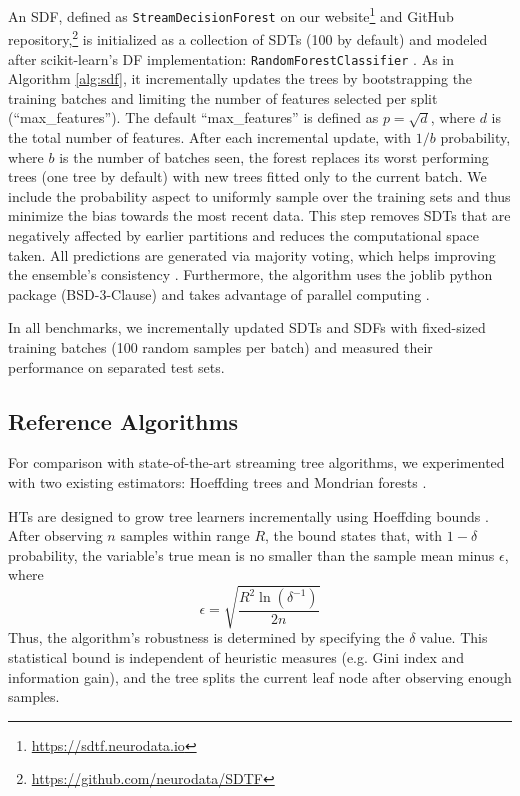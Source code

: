 An SDF, defined as \texttt{StreamDecisionForest} on our website\footnote{\url{https://sdtf.neurodata.io}} and GitHub repository,\footnote{\url{https://github.com/neurodata/SDTF}}
is initialized as a collection of SDTs (100 by default) and modeled after scikit-learn's DF implementation: \texttt{RandomForestClassifier} \citep{pedregosa_scikit-learn_2011}. As in Algorithm \ref{alg:sdf}, it incrementally updates the trees by bootstrapping the training batches and limiting the number of features selected per split (``max\_features''). The default ``max\_features'' is defined as $p=\sqrt{d}$, where $d$ is the total number of features. After each incremental update, with $1/b$ probability, where $b$ is the number of batches seen, the forest replaces its worst performing trees (one tree by default) with new trees fitted only to the current batch. We include the probability aspect to uniformly sample over the training sets and thus minimize the bias towards the most recent data. This step removes SDTs that are negatively affected by earlier partitions and reduces the computational space taken. All predictions are generated via majority voting, which helps improving the ensemble's consistency \citep{liaw_classification_2002, biau_consistency_2008, breiman_random_2001}. Furthermore, the algorithm uses the joblib python package (BSD-3-Clause) and takes advantage of parallel computing \citep{joblib_developers_joblibjoblib_2022}.

In all benchmarks, we incrementally updated SDTs and SDFs with fixed-sized training batches (100 random samples per batch) and measured their performance on separated test sets.

\subsection{Reference Algorithms}
For comparison with state-of-the-art streaming tree algorithms, we experimented with two existing estimators: Hoeffding trees and Mondrian forests \citep{domingos_mining_2000, lakshminarayanan_mondrian_2014, khannouz_benchmark_2020, pfahringer_new_2007, gomes_machine_2019, lakshminarayanan_mondrian_2016}. 

HTs are designed to grow tree learners incrementally using Hoeffding bounds \citep{domingos_mining_2000, hoeffding_probability_1994}. 
After observing $n$ samples within range $R$, the bound states that, with $1 - \delta$ probability, the variable's true mean is no smaller than the sample mean minus $\epsilon$, where 
\begin{equation*} \epsilon=\sqrt{\frac{R^2\ln(\delta^{-1})}{2n}} \tag{1} \end{equation*}
Thus, the algorithm's robustness is determined by specifying the $\delta$ value.
This statistical bound is independent of heuristic measures (e.g. Gini index and information gain), and the tree splits the current leaf node after observing enough samples.

